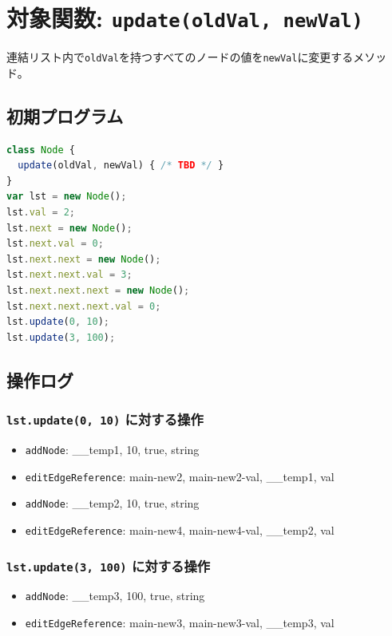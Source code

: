 \documentclass{article}
\begin{document}


\section{対象関数: \texttt{update(oldVal, newVal)}}
連結リスト内で\texttt{oldVal}を持つすべてのノードの値を\texttt{newVal}に変更するメソッド。

\subsection{初期プログラム}

\begin{lstlisting}[language=JavaScript]
class Node {
  update(oldVal, newVal) { /* TBD */ }
}
var lst = new Node(); 
lst.val = 2;
lst.next = new Node();
lst.next.val = 0;
lst.next.next = new Node();
lst.next.next.val = 3;
lst.next.next.next = new Node();
lst.next.next.next.val = 0;
lst.update(0, 10);
lst.update(3, 100);
\end{lstlisting}

\subsection{操作ログ}

\subsubsection{\texttt{lst.update(0, 10)} に対する操作}
\begin{itemize}
  \item \texttt{addNode}: \_\_temp1, 10, true, string
  \item \texttt{editEdgeReference}: main-new2, main-new2-val, \_\_temp1, val
  \item \texttt{addNode}: \_\_temp2, 10, true, string
  \item \texttt{editEdgeReference}: main-new4, main-new4-val, \_\_temp2, val
\end{itemize}

\subsubsection{\texttt{lst.update(3, 100)} に対する操作}
\begin{itemize}
  \item \texttt{addNode}: \_\_temp3, 100, true, string
  \item \texttt{editEdgeReference}: main-new3, main-new3-val, \_\_temp3, val
\end{itemize}
\end{document}
